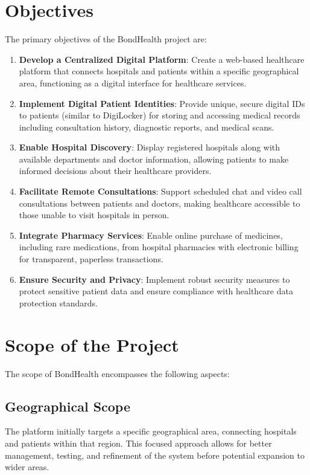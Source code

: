 \section{Objectives}
The primary objectives of the BondHealth project are:

\begin{enumerate}
    \item \textbf{Develop a Centralized Digital Platform}: Create a web-based healthcare platform that connects hospitals and patients within a specific geographical area, functioning as a digital interface for healthcare services.
    
    \item \textbf{Implement Digital Patient Identities}: Provide unique, secure digital IDs to patients (similar to DigiLocker) for storing and accessing medical records including consultation history, diagnostic reports, and medical scans.
    
    \item \textbf{Enable Hospital Discovery}: Display registered hospitals along with available departments and doctor information, allowing patients to make informed decisions about their healthcare providers.
    
    \item \textbf{Facilitate Remote Consultations}: Support scheduled chat and video call consultations between patients and doctors, making healthcare accessible to those unable to visit hospitals in person.
    
    \item \textbf{Integrate Pharmacy Services}: Enable online purchase of medicines, including rare medications, from hospital pharmacies with electronic billing for transparent, paperless transactions.
    
    \item \textbf{Ensure Security and Privacy}: Implement robust security measures to protect sensitive patient data and ensure compliance with healthcare data protection standards.
\end{enumerate}

\section{Scope of the Project}
The scope of BondHealth encompasses the following aspects:

\subsection{Geographical Scope}
The platform initially targets a specific geographical area, connecting hospitals and patients within that region. This focused approach allows for better management, testing, and refinement of the system before potential expansion to wider areas.

